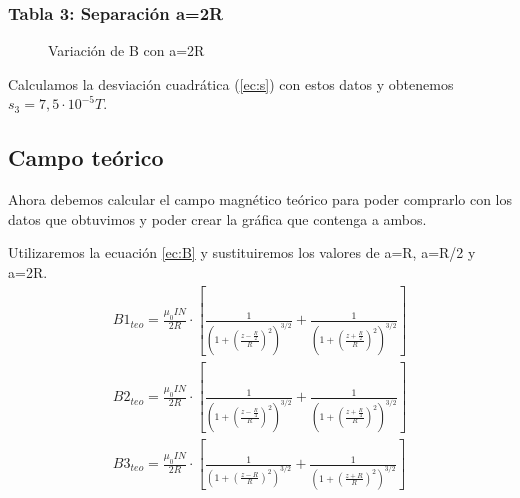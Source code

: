 \documentclass[12pt, a4paper, titlepage]{article}
\begin{document}
  \begin{minipage}{0.49\textwidth}
    \subsubsection{Tabla 3: Separación a=2R}

    \begin{figure}[H]
      \begin{table}[H]
         \quad
      \end{table}
      \caption{Variación de B con a=2R}
    \end{figure}

    Calculamos la desviación cuadrática (\ref{ec:s}) con estos datos y obtenemos $s_3 = 7,5 \cdot 10^{-5} T$.
  \end{minipage}

  \newpage
  \subsection{Campo teórico}

  Ahora debemos calcular el campo magnético teórico para poder comprarlo con los datos que obtuvimos y poder crear la gráfica que contenga a ambos.

  Utilizaremos la ecuación \ref{ec:B} y sustituiremos los valores de a=R, a=R/2 y a=2R.
  \begin{gather*}
    B1_{teo} = \frac{\mu_0 I N}{2R} \cdot \left[\frac{1}{\left(1 + \left(\frac{z - \frac{R}{2}}{R}\right)^2 \right)^{3/2}} + \frac{1}{\left(1 + \left(\frac{z + \frac{R}{2}}{R}\right)^2 \right)^{3/2}}\right] \nonumber \\
    B2_{teo} = \frac{\mu_0 I N}{2R} \cdot \left[\frac{1}{\left(1 + \left(\frac{z - \frac{R}{4}}{R}\right)^2 \right)^{3/2}} + \frac{1}{\left(1 + \left(\frac{z + \frac{R}{4}}{R}\right)^2 \right)^{3/2}}\right] \nonumber \\
    B3_{teo} = \frac{\mu_0 I N}{2R} \cdot \left[\frac{1}{\left(1 + \left(\frac{z - R}{R}\right)^2 \right)^{3/2}} + \frac{1}{\left(1 + \left(\frac{z + R}{R}\right)^2 \right)^{3/2}}\right] \nonumber
  \end{gather*}
\end{document}
